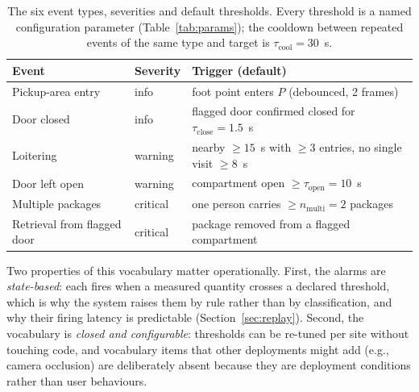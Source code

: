 \documentclass[journal,article,submit,oneauthor]{Definitions/mdpi}
\begin{document}
\begin{table}[H]
\caption{The six event types, severities and default thresholds. Every threshold is a named
configuration parameter (Table~\ref{tab:params}); the cooldown between repeated events of
the same type and target is $\tau_{\mathrm{cool}}=30$~s.\label{tab:events}}
\small
\begin{tabularx}{\textwidth}{l l X}
\toprule
\textbf{Event} & \textbf{Severity} & \textbf{Trigger (default)} \\
\midrule
Pickup-area entry & info & foot point enters $P$ (debounced, 2 frames) \\
Door closed & info & flagged door confirmed closed for $\tau_{\mathrm{close}}=1.5$~s \\
Loitering & warning & nearby $\ge 15$~s with $\ge 3$ entries, no single visit $\ge 8$~s \\
Door left open & warning & compartment open $\ge \tau_{\mathrm{open}}=10$~s \\
Multiple packages & critical & one person carries $\ge n_{\mathrm{multi}}=2$ packages \\
Retrieval from flagged door & critical & package removed from a flagged compartment \\
\bottomrule
\end{tabularx}
\end{table}

Two properties of this vocabulary matter operationally. First, the alarms are
\emph{state-based}: each fires when a measured quantity crosses a declared threshold, which
is why the system raises them by rule rather than by classification, and why their firing
latency is predictable (Section~\ref{sec:replay}). Second, the vocabulary is
\emph{closed and configurable}: thresholds can be re-tuned per site without touching code,
and vocabulary items that other deployments might add (e.g., camera occlusion) are
deliberately absent because they are deployment conditions rather than user behaviours.
\end{document}
